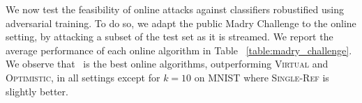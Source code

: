 We now test the feasibility of online attacks against classifiers robustified using adversarial training. To do so, we adapt the public Madry Challenge \citep{madry2017towards} to the online setting, by attacking a subset of the test set as it is streamed. We report the average performance of each online algorithm in Table ~\ref{table:madry_challenge}. We observe that \algoname\ is the best online algorithms, outperforming \textsc{Virtual} and \textsc{Optimistic}, in all settings except for $k=10$ on MNIST where \textsc{Single-Ref} is slightly better. 

